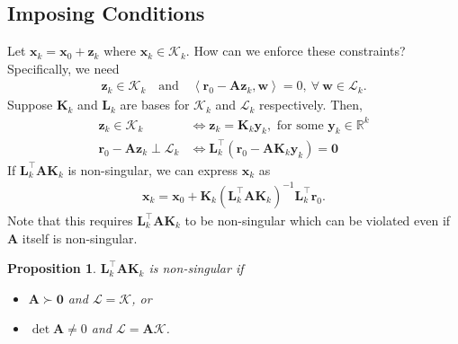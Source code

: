 \documentclass[12pt,a4paper]{article} %
\newtheorem*{proposition}{Proposition}
\begin{document}
\subsection{Imposing Conditions}
Let $\bm x_k = \bm x_0 + \bm z_k$ where $\bm x_k \in \mathcal K_k$.
How can we enforce these constraints? Specifically, we need
\begin{align*}
    \bm{z}_{k} \in \mathcal{K}_{k}
    \quad\text{and}\quad
    \left\langle\bm{r}_{0}-\mathbf{A} \bm{z}_{k}, \bm{w}\right\rangle= 0, ~\forall ~\bm{w} \in \mathcal{L}_{k}.
\end{align*}
Suppose $\mathbf K_k$ and $\mathbf L_k$ are bases for $\mathcal K_k$
and $\mathcal L_k$ respectively.  Then, 
\begin{align*}
    \bm{z}_{k} \in \mathcal{K}_{k} &\iff  \bm z_k = \mathbf K_k \bm y_k, \text{ for some } \bm y_k \in \mathbb R^k \\ 
    \bm r_0 - \mathbf A \bm z_k \perp \mathcal L_k &\iff \mathbf L_k^\top (\bm r_0 - \mathbf A \mathbf K_k \bm y_k) = \mathbf 0
\end{align*}
If $\mathbf L_k^\top \mathbf A \mathbf K_k$ is non-singular, we can express $\bm x_k$ as 
\begin{align*}
    \bm x_k = \bm x_0 + \mathbf K_k (\mathbf L_k^\top \mathbf A \mathbf K_k)^{-1} \mathbf L_k^\top \bm r_0.
\end{align*}
Note that this requires $\mathbf L_k^\top \mathbf A \mathbf K_k$ to be non-singular
 which 
can be violated even if $\mathbf A$ itself is non-singular.

\begin{proposition}
    $\mathbf L_k^\top \mathbf A \mathbf K_k$ is non-singular if 
    \begin{itemize}
        \item $\mathbf A \succ \bm 0$ and $\mathcal L = \mathcal K$, or 
        \item $\det \mathbf A \ne 0$ and $\mathcal L = \mathbf A \mathcal K$.
    \end{itemize}
\end{proposition}
\end{document}

